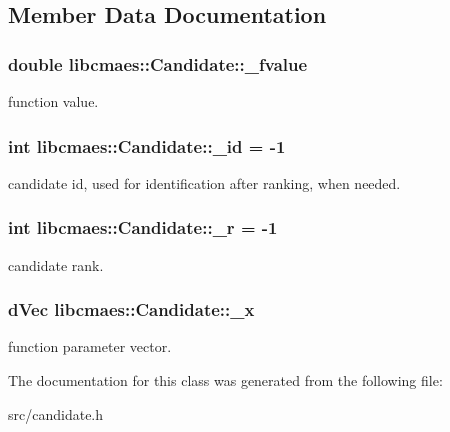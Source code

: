 \subsection{Member Data Documentation}
\hypertarget{classlibcmaes_1_1Candidate_af8797627514ae7e137317337372fb67d}{
\subsubsection[{\+\_\+fvalue}]{\setlength{\rightskip}{0pt plus 5cm}double libcmaes\+::\+Candidate\+::\+\_\+fvalue\hspace{0.3cm}{\ttfamily [protected]}}}\label{classlibcmaes_1_1Candidate_af8797627514ae7e137317337372fb67d}
function value. \hypertarget{classlibcmaes_1_1Candidate_a9737d4522cdf968ea575d8e989bfe4ac}{
\subsubsection[{\+\_\+id}]{\setlength{\rightskip}{0pt plus 5cm}int libcmaes\+::\+Candidate\+::\+\_\+id = -\/1\hspace{0.3cm}{\ttfamily [protected]}}}\label{classlibcmaes_1_1Candidate_a9737d4522cdf968ea575d8e989bfe4ac}
candidate id, used for identification after ranking, when needed. \hypertarget{classlibcmaes_1_1Candidate_a776ee8e4864d5e5322f1593dc4242619}{
\subsubsection[{\+\_\+r}]{\setlength{\rightskip}{0pt plus 5cm}int libcmaes\+::\+Candidate\+::\+\_\+r = -\/1\hspace{0.3cm}{\ttfamily [protected]}}}\label{classlibcmaes_1_1Candidate_a776ee8e4864d5e5322f1593dc4242619}
candidate rank. \hypertarget{classlibcmaes_1_1Candidate_a0cded1d38ec7288e8064414c78023fe4}{
\subsubsection[{\+\_\+x}]{\setlength{\rightskip}{0pt plus 5cm}d\+Vec libcmaes\+::\+Candidate\+::\+\_\+x\hspace{0.3cm}{\ttfamily [protected]}}}\label{classlibcmaes_1_1Candidate_a0cded1d38ec7288e8064414c78023fe4}
function parameter vector. 

The documentation for this class was generated from the following file\+:\begin{DoxyCompactItemize}
\item 
src/candidate.\+h\end{DoxyCompactItemize}
